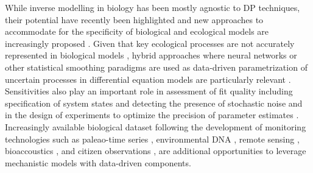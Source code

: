 While inverse modelling in biology has been mostly agnostic to DP techniques, their potential have recently been highlighted \cite{frank2022,alsos2023} and new approaches to accommodate for the specificity of biological and ecological models are increasingly proposed \cite{Yazdani2020,Boussange2024,paredes2023}. 
Given that key ecological processes are not accurately represented in biological models \cite{hartig2012,Schartau2017,chalmandrier2021}, hybrid approaches where neural networks or other statistical smoothing paradigms are used as data-driven parametrization of uncertain processes in differential equation models are particularly relevant \cite{ramsay1996principal,cao2008estimating,paul2011semiparametric,chen2017network,rasp2018,dai2022kernel,Boussange2024}. Sensitivities also play an important role in assessment of fit quality including specification of system states and detecting the presence of stochastic noise \cite{hooker2009forcing,hooker2015goodness,liu2023specification} and in the design of experiments to optimize the precision of parameter estimates \cite{bauer2000numerical}. 
Increasingly available biological dataset following the development of monitoring technologies such as paleao-time series \cite{alsos2023}, environmental DNA \cite{Ruppert2019}, remote sensing \cite{Jetz2019}, bioaccoustics \cite{Aide2013}, and citizen observations \cite{GBIF}, are additional opportunities to leverage mechanistic models with data-driven components.
